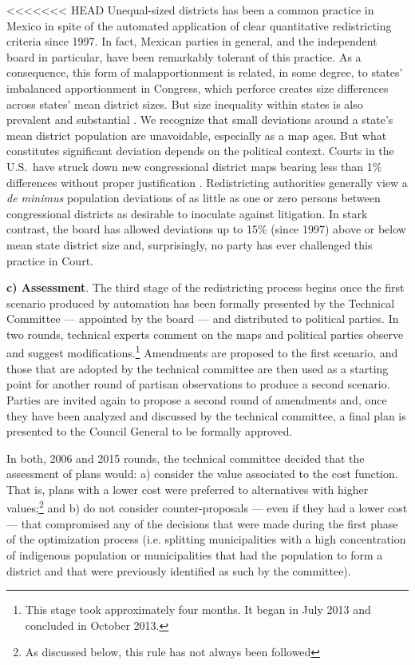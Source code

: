 \documentclass[letter,12pt]{article}
\begin{document}
<<<<<<< HEAD
Unequal-sized districts has been a common practice in Mexico in spite of the automated application of clear quantitative redistricting criteria since 1997. In fact, Mexican parties in general, and the independent board in particular, have been remarkably tolerant of this practice. As a consequence, this form of malapportionment is related, in some degree, to states' imbalanced apportionment in Congress, which perforce creates size differences across states' mean district sizes. But size inequality within states is also prevalent and substantial \citep{magar.etalBiasMultiParty2015}. We recognize that small deviations around a state's mean district population are unavoidable, especially as a map ages. But what constitutes significant deviation depends on the political context. Courts in the U.S.\ have struck down new congressional district maps bearing less than 1\% differences without proper justification \citep{tuckerApportionment.1985}. Redistricting authorities generally view a \emph{de minimus} population deviations of as little as one or zero persons between congressional districts as desirable to inoculate against litigation. In stark contrast, the board has allowed deviations up to 15\% (since 1997) above or below mean state district size \citep{lujambio.vives.2008,trelles.mtz.polygob2012} and, surprisingly, no party has ever challenged this practice in Court. 

\textbf{c) Assessment}. The third stage of the redistricting process begins once the first scenario produced by automation has been formally presented by the Technical Committee --- appointed by the board --- and distributed to political parties. In two rounds, technical experts comment on the maps and political parties observe and suggest modifications.\footnote{This stage took approximately four months. It began in July 2013 and concluded in October 2013.} Amendments are proposed to the first scenario, and those that are adopted by the technical committee are then used as a starting point for another round of partisan observations to produce a second scenario. Parties are invited again to propose a second round of amendments and, once they have been analyzed and discussed by the technical committee, a final plan is presented to the Council General to be formally approved. 

In both, 2006 and 2015 rounds, the technical committee decided that the assessment of plans would: a) consider the value associated to the cost function. That is, plans with a lower cost were preferred to alternatives with higher values;\footnote{As discussed below, this rule has not always been followed} and b) do not consider counter-proposals --- even if they had a lower cost --- that compromised any of the decisions that were made during the first phase of the optimization process (i.e. splitting municipalities with a high concentration of indigenous population or municipalities that had the population to form a district and that were previously identified as such by the committee).  
\end{document}
